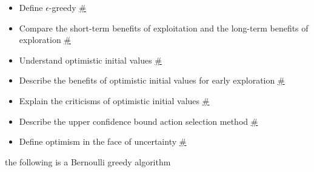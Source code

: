 \documentclass[
  letterpaper,
  DIV=11,
  numbers=noendperiod,
  oneside]{scrartcl}
\providecommand{\tightlist}{%
  \setlength{\itemsep}{0pt}\setlength{\parskip}{0pt}}\usepackage{longtable,booktabs,array}
\theoremstyle{definition}
\theoremstyle{remark}
\begin{document}
\begin{tcolorbox}[enhanced jigsaw, left=2mm, leftrule=.75mm, bottomtitle=1mm, toptitle=1mm, title=\textcolor{quarto-callout-note-color}{\faInfo}\hspace{0.5em}{Goals}, breakable, toprule=.15mm, colbacktitle=quarto-callout-note-color!10!white, coltitle=black, colback=white, opacityback=0, rightrule=.15mm, bottomrule=.15mm, colframe=quarto-callout-note-color-frame, titlerule=0mm, opacitybacktitle=0.6, arc=.35mm]

\begin{itemize}
\tightlist
\item
  Define \(\epsilon\)-greedy \hyperref[sec-epsilon-greedy-policies]{\#}
\item
  Compare the short-term benefits of exploitation and the long-term
  benefits of exploration
  \hyperref[sec-benefits-of-exploitation-and-exploration]{\#}
\item
  Understand optimistic initial values
  \hyperref[sec-optimistic-initial-values]{\#}
\item
  Describe the benefits of optimistic initial values for early
  exploration
  \hyperref[sec-benefits-of-optimistic-initial-values-for-early-exploration]{\#}
\item
  Explain the criticisms of optimistic initial values
  \hyperref[sec-criticisms-of-optimistic-initial-values]{\#}
\item
  Describe the upper confidence bound action selection method
  \hyperref[L3G6]{\#}
\item
  Define optimism in the face of uncertainty \hyperref[L3G7]{\#}
\end{itemize}

\end{tcolorbox}

the following is a Bernoulli greedy algorithm
\end{document}
